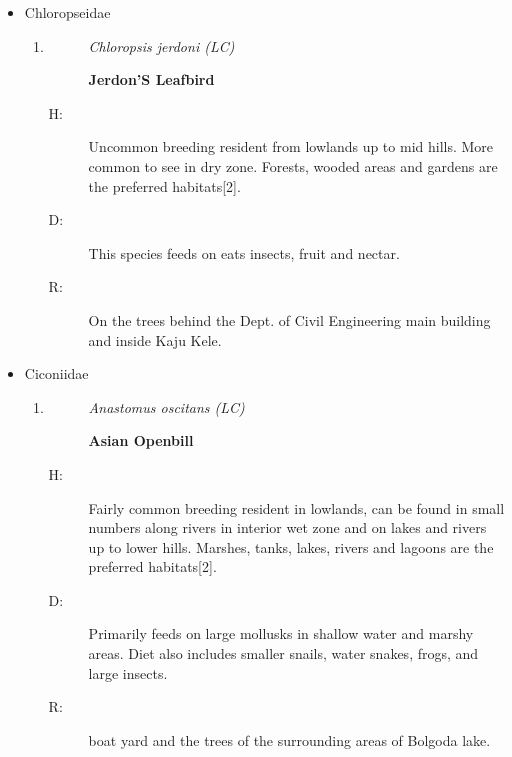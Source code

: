 \begin{itemize}
\begin{enumerate}
\begin{description}
\item[D: ]%
Insects, worms, and other invertebrates. They forage by running and probing the ground with their long bills.%
\item[R: ]%
Observed very commonly in the university ground premises.%
\end{description}%
\end{enumerate}%
\item%
Chloropseidae%
\begin{enumerate}%
\item%
\begin{description}%
\item[]%
\textit{Chloropsis jerdoni (LC)}%
\item[]%
\textbf{Jerdon'S Leafbird}%
\end{description}%
\begin{description}%
\item[H: ]%
Uncommon breeding resident from lowlands up to mid hills. More common to see in dry zone. Forests, wooded areas and gardens are the preferred habitats{[}2{]}.%
\item[D: ]%
This species feeds on eats insects, fruit and nectar. %
\item[R: ]%
On the trees behind the Dept. of Civil Engineering main building and inside Kaju Kele.%
\end{description}%
\end{enumerate}%
\item%
Ciconiidae%
\begin{enumerate}%
\item%
\begin{description}%
\item[]%
\textit{Anastomus oscitans (LC)}%
\item[]%
\textbf{Asian Openbill}%
\end{description}%
\begin{description}%
\item[H: ]%
Fairly common breeding resident in lowlands, can be found in small numbers along rivers in interior wet zone and on lakes and rivers up to lower hills. Marshes, tanks, lakes, rivers and lagoons are the preferred habitats{[}2{]}.%
\item[D: ]%
Primarily feeds on large mollusks in shallow water and marshy areas. Diet also includes smaller snails, water snakes, frogs, and large insects.%
\item[R: ]%
boat yard and the trees of the surrounding areas of Bolgoda lake.%
\end{description}%

\end{enumerate}
\end{itemize}
